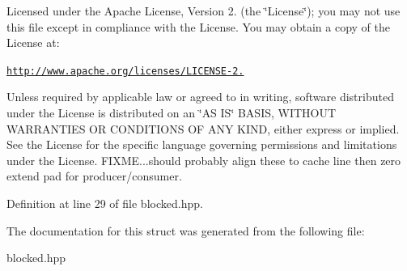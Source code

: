 Licensed under the Apache License, Version 2. (the \char`\"{}\+License\char`\"{}); you may not use this file except in compliance with the License. You may obtain a copy of the License at\+:

\href{http://www.apache.org/licenses/LICENSE-2.0}{\tt http\+://www.\+apache.\+org/licenses/\+L\+I\+C\+E\+N\+S\+E-\/2.}

Unless required by applicable law or agreed to in writing, software distributed under the License is distributed on an \char`\"{}\+A\+S I\+S\char`\"{} B\+A\+S\+IS, W\+I\+T\+H\+O\+UT W\+A\+R\+R\+A\+N\+T\+I\+ES OR C\+O\+N\+D\+I\+T\+I\+O\+NS OF A\+NY K\+I\+ND, either express or implied. See the License for the specific language governing permissions and limitations under the License. F\+I\+X\+ME...should probably align these to cache line then zero extend pad for producer/consumer. 

Definition at line 29 of file blocked.\+hpp.



The documentation for this struct was generated from the following file\+:\begin{DoxyCompactItemize}
\item 
blocked.\+hpp\end{DoxyCompactItemize}
